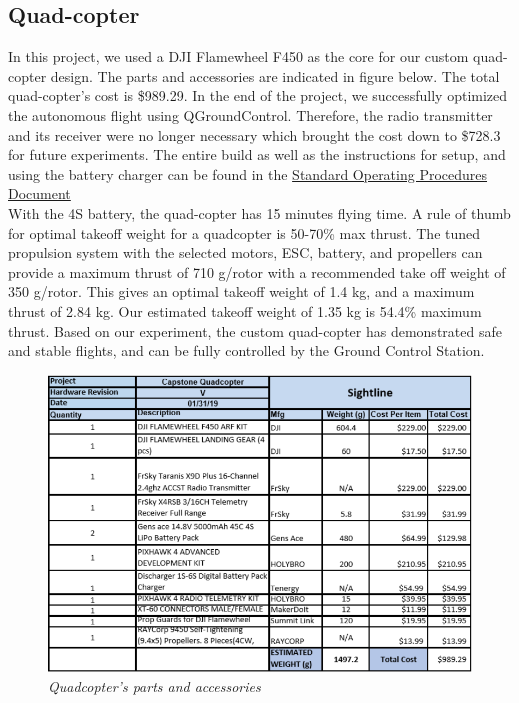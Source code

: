 \documentclass[11pt]{article}
\begin{document}
\subsection{Quad-copter}

In this project, we used a DJI Flamewheel F450 as the core for our custom quad-copter design. The parts and accessories are indicated in figure below. The total quad-copter's cost is \$989.29. In the end of the project, we successfully optimized the autonomous flight using QGroundControl. Therefore, the radio transmitter and its receiver were no longer necessary which brought the cost down to \$728.3 for future experiments. The entire build as well as the instructions for setup, and using the battery charger can be found in the \href{https://github.com/phamtaiece/Capstone-Sightline/blob/master/Final\%20Documentation/Standard\%20Operating\%20Procedures/SOP.pdf}{Standard Operating Procedures Document}
\\
With the 4S battery, the quad-copter has 15 minutes flying time. A rule of thumb for optimal takeoff weight for a quadcopter is 50-70\% max thrust. The tuned propulsion system with the selected motors, ESC, battery, and propellers can provide a maximum thrust of 710 g/rotor with a recommended take off weight of 350 g/rotor. This gives an optimal takeoff weight of 1.4 kg, and a maximum thrust of 2.84 kg. Our estimated takeoff weight of 1.35 kg is 54.4\% maximum thrust. Based on our experiment, the custom quad-copter has demonstrated safe and stable flights, and can be fully controlled by the Ground Control Station.  
\newpage
\begin{figure}[h!bt]
\centering	
\includegraphics[width=7 in]{quadcopter_part}
\caption{\textit{Quadcopter's parts and accessories}}	
\end{figure} 
\end{document}

